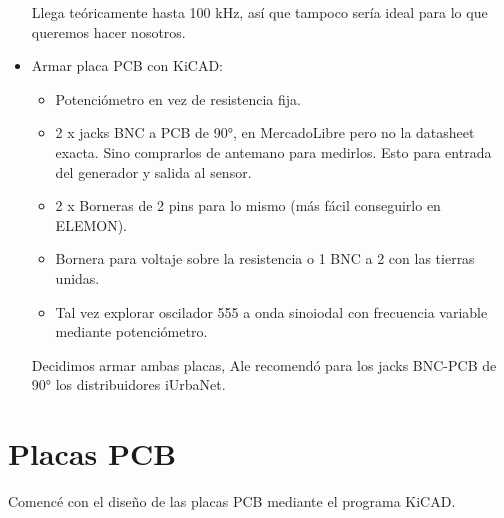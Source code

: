 \begin{itemize}
	Llega teóricamente hasta 100 kHz, así que tampoco sería ideal para lo que queremos hacer nosotros.
	
	
	\item Armar placa PCB con KiCAD:
	
	\begin{itemize}
		\item Potenciómetro en vez de resistencia fija.
		\item 2 x jacks BNC a PCB de 90°, en MercadoLibre pero no la datasheet exacta. Sino comprarlos de antemano para medirlos. Esto para entrada del generador y salida al sensor.
		\item 2 x Borneras de 2 pins para lo mismo (más fácil conseguirlo en ELEMON).
		\item Bornera para voltaje sobre la resistencia o 1 BNC a 2 con las tierras unidas.
		\item Tal vez explorar oscilador 555 a onda sinoiodal con frecuencia variable mediante potenciómetro. 
	\end{itemize}
	
	Decidimos armar ambas placas, Ale recomendó para los jacks BNC-PCB de 90° los distribuidores iUrbaNet. %
	
\end{itemize}

\section{Placas PCB}
Comencé con el diseño de las placas PCB mediante el programa KiCAD.

